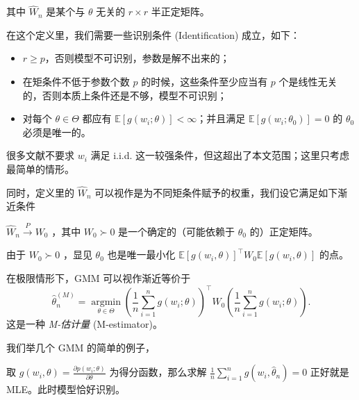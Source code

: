\begin{remark}
\begin{definition*}[广义矩估计]
其中 $\widehat{W}_n$ 是某个与 $\theta$ 无关的 $r \times r$ 半正定矩阵。
\end{definition*}

在这个定义里，我们需要一些识别条件 (Identification) 成立，如下：

\begin{assumption}[识别性]\label{ass:ch6:identifiability}
\begin{itemize}
\item
  $r\ge p$，否则模型不可识别，参数是解不出来的；
\item
  在矩条件不低于参数个数 $p$ 的时候，这些条件至少应当有 $p$ 个是线性无关的，否则本质上条件还是不够，模型不可识别；
\item
  对每个 $\theta\in\Theta$ 都应有 $\mathbb{E}[g(w_i;\theta)]<\infty$；并且满足 $\mathbb{E}[g(w_i;\theta_0)]=0$ 的 $\theta_0$ 必须是唯一的。
\end{itemize}
\end{assumption}

\begin{remark}
很多文献不要求 $w_i$ 满足 i.i.d. 这一较强条件，但这超出了本文范围；这里只考虑最简单的情形。
\end{remark}

同时，定义里的 $\widehat W_n$ 可以视作是为不同矩条件赋予的权重，我们设它满足如下渐近条件

\begin{assumption}[权重矩阵]\label{ass:ch6:weight-matrix}

$\widehat W_n\overset P\to W_0$ ，其中 $W_0\succ 0$ 是一个确定的（可能依赖于 $\theta_0$ 的）正定矩阵。

\end{assumption}

由于 $W_0\succ 0$ ，显见 $\theta_0$ 也是唯一最小化 $\mathbb{E}[g(w_i,\theta)]^\top W_0\mathbb{E}[g(w_i,\theta)]$ 的点。

\begin{remark}
在极限情形下，GMM 可以视作渐近等价于
\[
\widehat\theta_n^{(M)}
=\operatorname*{\arg\min}_{\theta\in\Theta}
\left(\frac1n\sum_{i=1}^n g(w_i;\theta)\right)^\top
W_0
\left(\frac1n\sum_{i=1}^n g(w_i;\theta)\right).
\]
这是一种 \emph{M-估计量} (M-estimator)。
\end{remark}

我们举几个 GMM 的简单的例子，

\begin{example}
取 $g(w_i,\theta)=\frac{\partial p(w_i;\theta)}{\partial\theta}$ 为得分函数，那么求解 $\frac{1}{n}\sum_{i=1}^n g(w_i,\widehat\theta_n)=0$ 正好就是 MLE。此时模型恰好识别。
\end{example}



\end{remark}
